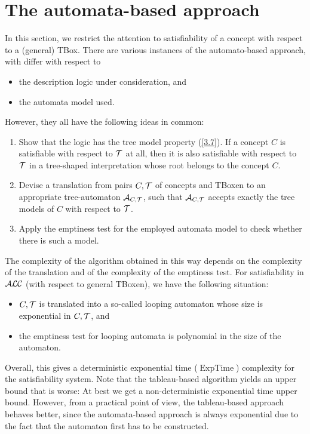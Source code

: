 \documentclass[openany]{scrbook}
\theoremstyle{break}
\theoremstyle{nonumberbreak}
\theoremstyle{nonumberplain}
\theoremstyle{nonumberbreak}
\newcommand{\ALC}{{\cal A}{\cal L}{\cal C}}
\begin{document}
\section{The automata-based approach}
In this section, we restrict the attention to satisfiability of a
concept with respect to a (general) TBox. There are various instances
of the automato-based approach, with differ with respect to
\begin{itemize}
\item the description logic under consideration, and
\item the automata model used.
\end{itemize}
However, they all have the following ideas in common:
\begin{enumerate}
\item Show that the logic has the tree model property (\cref{3.7}). If
  a concept $C$ is satisfiable with respect to ${\cal T}$ at all, then
  it is also satisfiable with respect to ${\cal T}$ in a tree-shaped
  interpretation whose root belongs to the concept $C$.
\item Devise a translation from pairs $C, {\cal T}$ of concepts and
  TBoxen to an appropriate tree-automaton ${\cal A}_{C, {\cal T}}$,
  such that ${\cal A}_{C, {\cal T}}$ accepts exactly the tree models
  of $C$ with respect to ${\cal T}$.
\item Apply the emptiness test for the employed automata model to
  check whether there is such a model.
\end{enumerate}

The complexity of the algorithm obtained in this way depends on the
complexity of the translation and of the complexity of the emptiness
test. For satisfiability in $\ALC$ (with respect to general TBoxen),
we have the following situation:
\begin{itemize}
\item $C, {\cal T}$ is translated into a so-called looping automaton
  whose size is exponential in $C, {\cal T}$, and
\item the emptiness test for looping automata is polynomial in the
  size of the automaton.
\end{itemize}

Overall, this gives a deterministic exponential time
($\operatorname{ExpTime}$) complexity for the satisfiability
system. Note that the tableau-based algorithm yields an upper bound
that is worse: At best we get a non-deterministic exponential time
upper bound. However, from a practical point of view, the
tableau-based approach behaves better, since the automata-based
approach is always exponential due to the fact that the automaton
first has to be constructed.
\end{document}
